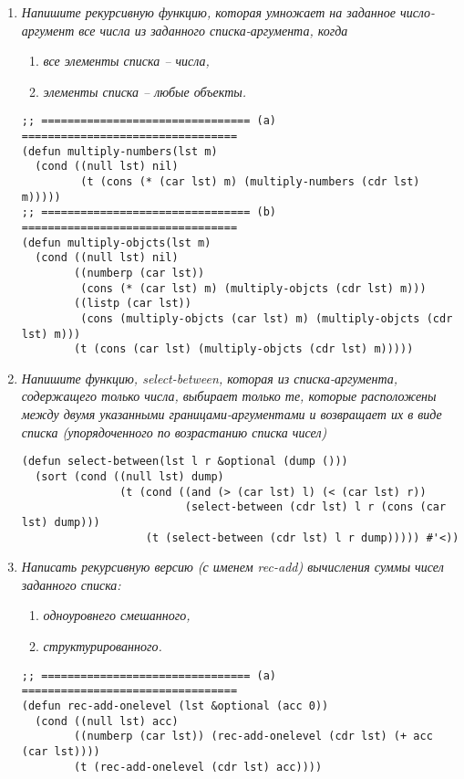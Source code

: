 \begin{enumerate}[wide=0pt]
\item \textit{Напишите рекурсивную функцию, которая умножает на заданное число-аргумент все числа из заданного списка-аргумента, когда}
\begin{enumerate}
	\item \textit{все элементы списка -- числа,}
	\item \textit{элементы списка -- любые объекты.} \newpage
\end{enumerate}
\begin{lstlisting}
;; ================================ (a) =================================
(defun multiply-numbers(lst m)
  (cond ((null lst) nil)
         (t (cons (* (car lst) m) (multiply-numbers (cdr lst) m)))))
;; ================================ (b) =================================
(defun multiply-objcts(lst m)
  (cond ((null lst) nil)
        ((numberp (car lst)) 
         (cons (* (car lst) m) (multiply-objcts (cdr lst) m)))
        ((listp (car lst)) 
         (cons (multiply-objcts (car lst) m) (multiply-objcts (cdr lst) m)))
        (t (cons (car lst) (multiply-objcts (cdr lst) m)))))
\end{lstlisting}
\item \textit{Напишите функцию, select-between, которая из списка-аргумента, содержащего только числа, выбирает только те, которые расположены между двумя указанными границами-аргументами и возвращает их в виде списка (упорядоченного по возрастанию списка чисел)}
\begin{lstlisting}
(defun select-between(lst l r &optional (dump ()))
  (sort (cond ((null lst) dump)
               (t (cond ((and (> (car lst) l) (< (car lst) r))
                         (select-between (cdr lst) l r (cons (car lst) dump)))
                   (t (select-between (cdr lst) l r dump))))) #'<))
\end{lstlisting}
\item \textit{Написать рекурсивную версию (с именем rec-add) вычисления суммы чисел заданного списка:}
\begin{enumerate}
	\item \textit{одноуровнего смешанного,}
	\item \textit{структурированного.}
\end{enumerate}
\begin{lstlisting}
;; ================================ (a) =================================
(defun rec-add-onelevel (lst &optional (acc 0))
  (cond ((null lst) acc)
        ((numberp (car lst)) (rec-add-onelevel (cdr lst) (+ acc (car lst))))
        (t (rec-add-onelevel (cdr lst) acc))))


\end{lstlisting}
\end{enumerate}
